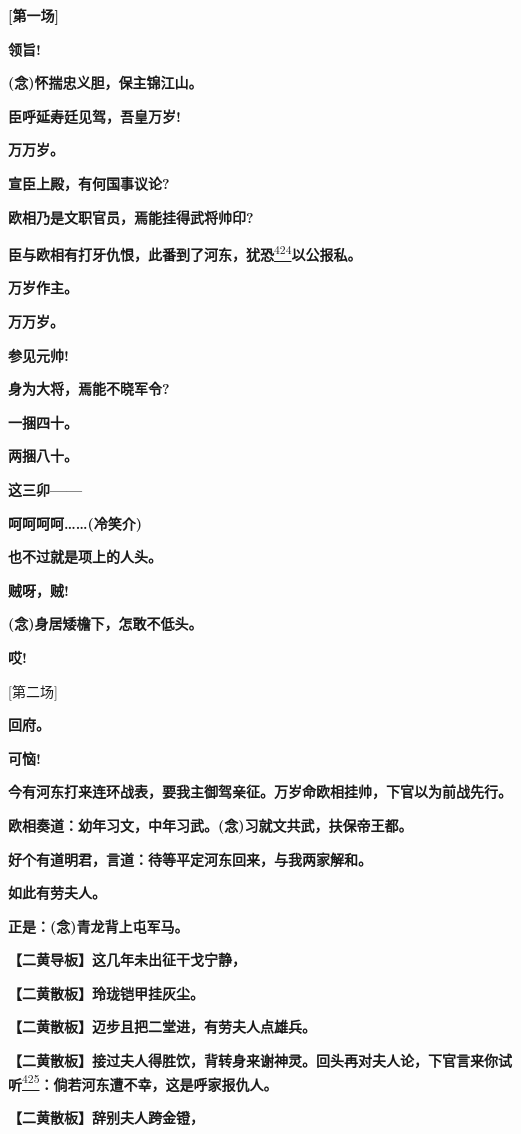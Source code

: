 \textbf{{[}第一场{]}}

\textbf{领旨!}

\textbf{(念)怀揣忠义胆，保主锦江山。}

\textbf{臣呼延寿廷见驾，吾皇万岁!}

\textbf{万万岁。}

\textbf{宣臣上殿，有何国事议论?}

\textbf{欧相乃是文职官员，焉能挂得武将帅印?}

\textbf{臣与欧相有打牙仇恨，此番到了河东，犹恐}\protect\hyperlink{fn424}{\textsuperscript{424}}\textbf{以公报私。}

\textbf{万岁作主。}

\textbf{万万岁。}

\textbf{参见元帅!}

\textbf{身为大将，焉能不晓军令?}

\textbf{一捆四十。}

\textbf{两捆八十。}

\textbf{这三卯------}

\textbf{呵呵呵呵\ldots{}\ldots{}(冷笑介)}

\textbf{也不过就是项上的人头。}

\textbf{贼呀，贼!}

\textbf{(念)身居矮檐下，怎敢不低头。}

\textbf{哎!}

{[}第二场{]}

\textbf{回府。}

\textbf{可恼!}

\textbf{今有河东打来连环战表，要我主御驾亲征。万岁命欧相挂帅，下官以为前战先行。}

\textbf{欧相奏道：幼年习文，中年习武。(念)习就文共武，扶保帝王都。}

\textbf{好个有道明君，言道：待等平定河东回来，与我两家解和。}

\textbf{如此有劳夫人。}

\textbf{正是：(念)青龙背上屯军马。}

\textbf{【二黄导板】这几年未出征干戈宁静，}

\textbf{【二黄散板】玲珑铠甲挂灰尘。}

\textbf{【二黄散板】迈步且把二堂进，有劳夫人点雄兵。}

\textbf{【二黄散板】接过夫人得胜饮，背转身来谢神灵。回头再对夫人论，下官言来你试听}\protect\hyperlink{fn425}{\textsuperscript{425}}\textbf{：倘若河东遭不幸，这是呼家报仇人。}

\textbf{【二黄散板】辞别夫人跨金镫，}


